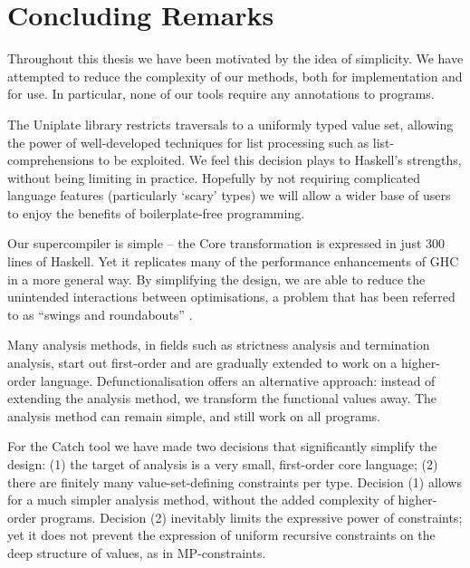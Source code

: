 \section{Concluding Remarks}
\label{secE:the_end}

Throughout this thesis we have been motivated by the idea of simplicity. We have attempted to reduce the complexity of our methods, both for implementation and for use. In particular, none of our tools require any annotations to programs.

The Uniplate library restricts traversals to a uniformly typed value set, allowing the power of well-developed techniques for list processing such as list-comprehensions to be exploited. We feel this decision plays to Haskell's strengths, without being limiting in practice. Hopefully by not requiring complicated language features (particularly `scary' types) we will allow a wider base of users to enjoy the benefits of boilerplate-free programming.

Our supercompiler is simple -- the Core transformation is expressed in just 300 lines of Haskell. Yet it replicates many of the performance enhancements of GHC in a more general way. By simplifying the design, we are able to reduce the unintended interactions between optimisations, a problem that has been referred to as ``swings and roundabouts'' \cite{marlow:fast_curry}.

Many analysis methods, in fields such as strictness analysis and termination analysis, start out first-order and are gradually extended to work on a higher-order language. Defunctionalisation offers an alternative approach: instead of extending the analysis method, we transform the functional values away. The analysis method can remain simple, and still work on all programs.

For the Catch tool we have made two decisions that significantly simplify the design: (1) the target of analysis is a very small, first-order core language; (2) there are finitely many value-set-defining constraints per type. Decision (1) allows for a much simpler analysis method, without the added complexity of higher-order programs. Decision (2) inevitably limits the expressive power of constraints; yet it does not prevent the expression of uniform recursive constraints on the deep structure of values, as in MP-constraints.

